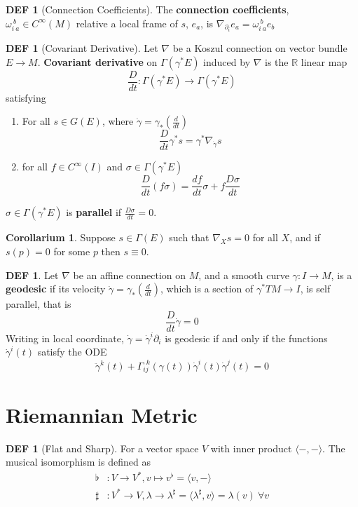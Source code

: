 \documentclass[twocolumn]{article}
\renewcommand{\emph}[1]{{\color{blue!70!black}\sffamily\bfseries #1}}
\newcommand{\n}{\nabla}
\newcommand{\R}{\mathbb{R}}
\newcommand{\C}{C^{\infty}}
\newcommand{\p}{\partial}
\newcommand{\G}{\Gamma}
\newcommand{\g}{\gamma}
\newcommand{\dg}{\dot{\gamma}}
\renewcommand{\dg}{\dot{\gamma}}
\theoremstyle{definition}
\newtheorem{corollary}[thm]{Corollarium}
\newtheorem{defi}[thm]{DEF}
\begin{document}
\begin{defi}[Connection Coefficients]
	The \emph{connection coefficients}, $\omega_{i\ a}^{\ b} \in \C(M)$ relative a local frame of $s$, $e_a$, is $\n_{\p_i} e_a = \omega_{i\ a}^{\ b} e_b$
\end{defi}

\begin{defi}[Covariant Derivative]
	Let $\n$ be a Koszul connection on vector bundle $E \rightarrow M$. 
	\emph{Covariant derivative} on $\G(\g^{*} E)$ induced by $\n$ is the $\R$ linear map 
	$$
	\frac{D}{dt} : \G(\g^* E) \rightarrow \G(\g^* E)
	$$
	satisfying 
	\begin{enumerate}
		\item For all $s \in G(E)$, where $\dot{\g} = \gamma_* (\frac{d}{dt})$
			$$
			\frac{D}{dt} \g^*s = \g^* \n_{\dot{\g}} s
			$$
		\item for all $f \in \C(I)$ and $\sigma \in \G(\g^*E)$
			$$
			\frac{D}{dt}(f \sigma) = \frac{df}{dt} \sigma + f \frac{D \sigma}{dt}
			$$
	\end{enumerate}

	$\sigma \in \G(\g^*E)$ is \emph{parallel} if $\frac{D \sigma}{dt} = 0$.
\end{defi}

\begin{corollary}
	Suppose $s \in \G(E)$ such that $\n_X s = 0$ for all $X$, and if $s(p) = 0$ for some $p$ then $s \equiv 0$.
\end{corollary}

\begin{defi}
	Let $\n$ be an affine connection on $M$, and a smooth curve $\gamma: I \rightarrow M$, is a \emph{geodesic} if its velocity $\dg = \g_{*}(\frac{d}{dt})$, which is a section of $\g^* TM \rightarrow I$, is self parallel, that is 
	$$
		\frac{D}{dt} \dg = 0
	$$
	Writing in local coordinate, $\dg = \dg^i \p_i$ is geodesic if and only if the functions $\dg^i(t)$ satisfy the ODE
	$$
	\ddot{\g}^k(t) + \G_{ij}^{\ \ k}(\g(t)) \dg^i(t) \dg^j(t) = 0
	$$

\end{defi}

\section{Riemannian Metric}

\begin{defi}[Flat and Sharp]
	 For a vector space $V$ with inner product $\langle -, - \rangle$. 
	 The musical isomorphism is defined as
	 \begin{align*}
		 \flat &: V \rightarrow V^*, v \mapsto v^{\flat} = \langle v, - \rangle \\
		 \sharp &:  V^* \rightarrow V, \lambda \rightarrow  \lambda^{\sharp} = \langle \lambda^{\sharp}, v \rangle = \lambda(v) \ \forall v
	 \end{align*}
\end{defi}
\end{document}
